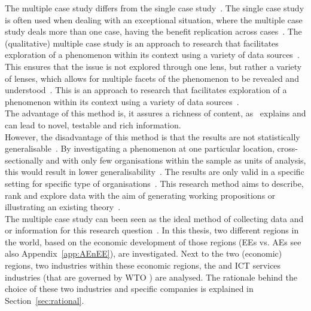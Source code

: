 The multiple case study differs from the single case study~\citep{van2008management,Yin:2009vh}.
The single case study is often used when dealing with an exceptional situation, where the multiple case study deals more than one case, having the benefit replication across cases~\citep{Saunders:2009wn}.
The (qualitative) multiple case study is an approach to research that facilitates exploration of a phenomenon within its context using a variety of data sources~\citep{Baxter:2008vu}.
This ensures that the issue is not explored through one lens, but rather a variety of lenses, which allows for multiple facets of the phenomenon to be revealed and understood~\citep{Baxter:2008vu}.
This is an approach to research that facilitates exploration of a phenomenon within its context using a variety of data sources~\citep{Baxter:2008vu}.\\
The advantage of this method is, it assures a richness of content, as~\cite{Eisenhardt:1989ww} explains and can lead to novel, testable and rich information.\\
However, the disadvantage of this method is that the results are not statistically generalisable~\citep{Yin:1981wc}.  
By investigating a phenomenon at one particular location, cross-sectionally and with only few organisations within the sample as units of analysis, this would result in lower generalisability~\citep{Klossek:2012wc}. 
The results are only valid in a specific setting for specific type of organisations~\citep{Deng:2007tr}.
This research method aims to describe, rank and explore data with the aim of generating working propositions or illustrating an existing theory~\citep{Eisenhardt:1989ww,Yin:1981wc}.\\
The multiple case study can been seen as the ideal method of collecting data and or information for this research question~\citep{Yin:2009vh}.
In this thesis, two different regions in the world, based on the economic development of those regions (\glspl{EE} vs. \glspl{AE} see also Appendix~\ref{app:AEnEE}), are investigated.
Next to the two (economic) regions, two industries within these economic regions, the \pharma and ICT services industries (that are governed by WTO \rr) are analysed. 
The rationale behind the choice of these two industries and specific companies is explained in Section~\ref{sec:rational}.

